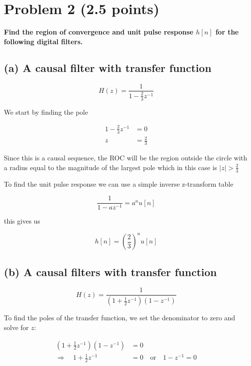 \section{Problem 2 (2.5 points)}
\textbf{Find the region of convergence and unit pulse response $h[n]$ for the following digital filters.}
\subsection*{(a) A causal filter with transfer function}
\begin{equation*}
     H(z)=\frac{1}{1-\frac{2}{3} z^{-1}} 
\end{equation*}

We start by finding the pole

\begin{align*}
    1-\frac{2}{3} z^{-1}&=0\\
    z&=\frac{2}{3}
\end{align*}

Since this is a causal sequence, the ROC will be the region outside the circle with a radius equal to the magnitude of the largest pole which in this case is $|z|>\frac{2}{3}$

To find the unit pulse response we can use a simple inverse z-transform table

\begin{equation*}
    \frac{1}{1-az^{-1}}=a^nu[n]
\end{equation*}

this gives us

\begin{equation*}
    h[n]=\left(\frac{2}{3}\right)^nu[n]
\end{equation*}

\subsection*{(b) A causal filters with transfer function}

\begin{equation*}
    H(z)=\frac{1}{\left(1+\frac{1}{2} z^{-1}\right)\left(1-z^{-1}\right)} 
\end{equation*}

To find the poles of the transfer function, we set the denominator to zero and solve for \( z \):

\begin{align*}
    \left(1+\frac{1}{2} z^{-1}\right)\left(1-z^{-1}\right) &= 0 \\
    \Rightarrow \quad 1+\frac{1}{2} z^{-1} &= 0 \quad \text{or} \quad 1 - z^{-1} = 0
\end{align*}

